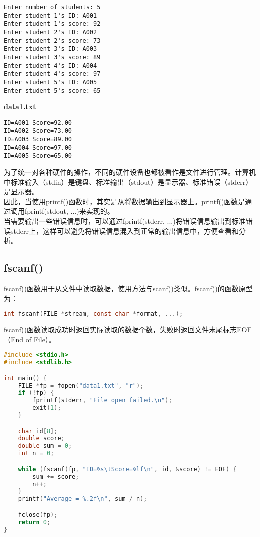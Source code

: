 \begin{tcolorbox}
    \begin{verbatim}
Enter number of students: 5
Enter student 1's ID: A001
Enter student 1's score: 92
Enter student 2's ID: A002
Enter student 2's score: 73
Enter student 3's ID: A003
Enter student 3's score: 89
Enter student 4's ID: A004
Enter student 4's score: 97
Enter student 5's ID: A005
Enter student 5's score: 65
	\end{verbatim}
\end{tcolorbox}

\begin{tcolorbox}
    \textbf{data1.txt}
    \begin{verbatim}
ID=A001	Score=92.00
ID=A002	Score=73.00
ID=A003	Score=89.00
ID=A004	Score=97.00
ID=A005	Score=65.00
	\end{verbatim}
\end{tcolorbox}

为了统一对各种硬件的操作，不同的硬件设备也都被看作是文件进行管理。计算机中标准输入（stdin）是键盘、标准输出（stdout）是显示器、标准错误（stderr）是显示器。\\

因此，当使用printf()函数时，其实是从将数据输出到显示器上。printf()函数是通过调用fprintf(stdout, ...)来实现的。\\

当需要输出一些错误信息时，可以通过fprintf(stderr, ...)将错误信息输出到标准错误stderr上，这样可以避免将错误信息混入到正常的输出信息中，方便查看和分析。\\

\subsection{fscanf()}

fscanf()函数用于从文件中读取数据，使用方法与scanf()类似。fscanf()的函数原型为：

\vspace{-0.5cm}

\begin{lstlisting}[language=C]
int fscanf(FILE *stream, const char *format, ...);
\end{lstlisting}

fscanf()函数读取成功时返回实际读取的数据个数，失败时返回文件末尾标志EOF（End of File）。\\


\begin{lstlisting}[language=C]
#include <stdio.h>
#include <stdlib.h>

int main() {
    FILE *fp = fopen("data1.txt", "r");
    if (!fp) {
        fprintf(stderr, "File open failed.\n");
        exit(1);
    }

    char id[8];
    double score;
    double sum = 0;
    int n = 0;

    while (fscanf(fp, "ID=%s\tScore=%lf\n", id, &score) != EOF) {
        sum += score;
        n++;
    }
    printf("Average = %.2f\n", sum / n);

    fclose(fp);
    return 0;
}
\end{lstlisting}

